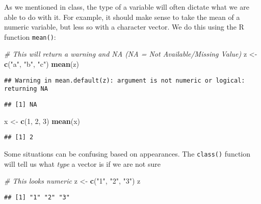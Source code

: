\documentclass[
]{article}
\newenvironment{Shaded}{\begin{snugshade}}{\end{snugshade}}
\newcommand{\CommentTok}[1]{\textcolor[rgb]{0.56,0.35,0.01}{\textit{#1}}}
\newcommand{\DecValTok}[1]{\textcolor[rgb]{0.00,0.00,0.81}{#1}}
\newcommand{\FunctionTok}[1]{\textcolor[rgb]{0.13,0.29,0.53}{\textbf{#1}}}
\newcommand{\NormalTok}[1]{#1}
\newcommand{\OtherTok}[1]{\textcolor[rgb]{0.56,0.35,0.01}{#1}}
\newcommand{\StringTok}[1]{\textcolor[rgb]{0.31,0.60,0.02}{#1}}
\begin{document}
As we mentioned in class, the type of a variable will often dictate what
we are able to do with it. For example, it should make sense to take the
mean of a numeric variable, but less so with a character vector. We do
this using the R function \texttt{mean()}:

\begin{Shaded}
\begin{Highlighting}[]
\CommentTok{\# This will return a warning and NA (NA = Not Available/Missing Value)}
\NormalTok{z }\OtherTok{\textless{}{-}} \FunctionTok{c}\NormalTok{(}\StringTok{"a"}\NormalTok{, }\StringTok{"b"}\NormalTok{, }\StringTok{"c"}\NormalTok{)}
\FunctionTok{mean}\NormalTok{(z)}
\end{Highlighting}
\end{Shaded}

\begin{verbatim}
## Warning in mean.default(z): argument is not numeric or logical: returning NA
\end{verbatim}

\begin{verbatim}
## [1] NA
\end{verbatim}

\begin{Shaded}
\begin{Highlighting}[]
\NormalTok{x }\OtherTok{\textless{}{-}} \FunctionTok{c}\NormalTok{(}\DecValTok{1}\NormalTok{, }\DecValTok{2}\NormalTok{, }\DecValTok{3}\NormalTok{)}
\FunctionTok{mean}\NormalTok{(x)}
\end{Highlighting}
\end{Shaded}

\begin{verbatim}
## [1] 2
\end{verbatim}

Some situations can be confusing based on appearances. The
\texttt{class()} function will tell us what \emph{type} a vector is if
we are not sure

\begin{Shaded}
\begin{Highlighting}[]
\CommentTok{\# This looks numeric}
\NormalTok{z }\OtherTok{\textless{}{-}} \FunctionTok{c}\NormalTok{(}\StringTok{"1"}\NormalTok{, }\StringTok{"2"}\NormalTok{, }\StringTok{"3"}\NormalTok{)}
\NormalTok{z}
\end{Highlighting}
\end{Shaded}

\begin{verbatim}
## [1] "1" "2" "3"
\end{verbatim}
\end{document}
